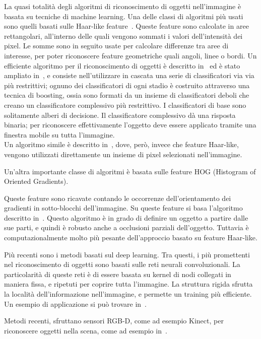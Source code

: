 La quasi totalità degli algoritmi di riconoscimento di oggetti nell'immagine è basata su tecniche di machine learning.
Una delle classi di algoritmi più usati sono quelli basati sulle Haar-like feature~\cite{710772}.
Queste feature sono calcolate in aree rettangolari, all'interno delle quali vengono sommati i valori dell'intensità dei pixel. Le somme sono in seguito usate per calcolare differenze tra aree di interesse, per poter riconoscere feature geometriche quali angoli, linee o bordi.
Un efficiente algoritmo per il riconoscimento di oggetti è descritto in~\cite{Viola01rapidobject} ed è stato ampliato in~\cite{Lienhart02anextended}, e consiste nell'utilizzare in cascata una serie di classificatori via via più restrittivi; ognuno dei classificatori di ogni stadio è costruito attraverso una tecnica di boosting, ossia sono formati da un insieme di classificatori deboli che creano un classificatore complessivo più restrittivo. I classificatori di base sono solitamente alberi di decisione. Il classificatore complessivo d\`a una risposta binaria; per riconoscere effettivamente l'oggetto deve essere applicato tramite una finestra mobile su tutta l'immagine. \\
Un algoritmo simile \`e descritto in~\cite{journals/ijista/AbramsonSG07}, dove, però, invece che feature Haar-like, vengono utilizzati direttamente un insieme di pixel selezionati nell'immagine.

Un'altra importante classe di algoritmi è basata sulle feature HOG (Histogram of Oriented Gradients). %

Queste feature sono ricavate contando le occorrenze dell'orientamento dei gradienti in sotto-blocchi dell'immagine.
Su queste feature si basa l'algoritmo descritto in~\cite{lsvm-pami}. Questo algoritmo è in grado di definire un oggetto a partire dalle sue parti, e quindi è robusto anche a occlusioni parziali dell'oggetto. Tuttavia è computazionalmente molto più pesante dell'approccio basato su feature Haar-like.

Più recenti sono i metodi basati sul deep learning. Tra questi, i più promettenti nel riconoscimento di oggetti sono basati sulle reti neurali convoluzionali. La particolarità di queste reti è di essere basata su kernel di nodi collegati in maniera fissa, e ripetuti per coprire tutta l'immagine. La struttura rigida sfrutta la località dell'informazione nell'immagine, e permette un training più efficiente.
Un esempio di applicazione si può trovare in~\cite{NIPS2012_4824}.

Metodi recenti, sfruttano sensori RGB-D, come ad esempio Kinect, per riconoscere oggetti nella scena, come ad esempio in~\cite{lai2012detection}. %

